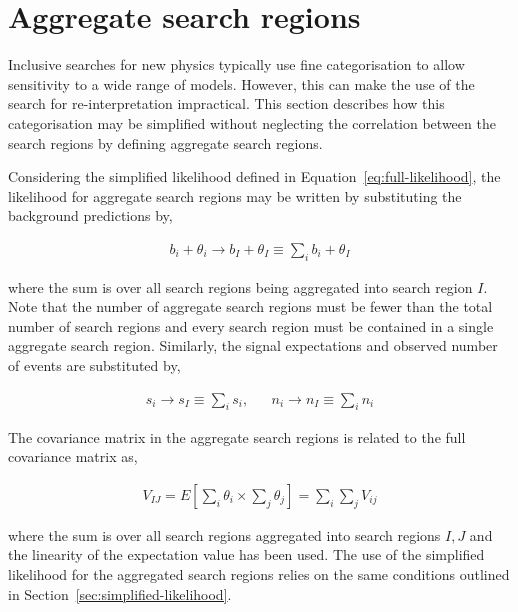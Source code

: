 \section{Aggregate search regions}
\label{sec:aggregate-signal-regions}

Inclusive searches for new physics typically use fine categorisation to allow
sensitivity to a wide range of models. However, this can make the use
of the search for re-interpretation impractical. 
This section describes how this categorisation may be simplified without neglecting the correlation 
between the search regions by defining aggregate search regions.

Considering the simplified likelihood defined in Equation~\ref{eq:full-likelihood},
the likelihood for aggregate search regions may be written by substituting the 
background predictions by,

\begin{align}
b_{i} + \theta_i \rightarrow b_I + \theta_I \equiv \sum_{i}b_{i} + \theta_I
\label{eq:b-agg}
\end{align}

where the sum is over all search regions being aggregated into search region $I$.
Note that the number of aggregate search regions must be fewer than the total number of search regions and 
every search region must be contained in a single aggregate search region. 
Similarly, the signal expectations and observed number of events are substituted by, 

\begin{align}
 s_{i}  \rightarrow s_{I} \equiv \sum_{i}s_{i},  &&  n_{i}  \rightarrow n_{I} \equiv \sum_{i}n_{i} 
\label{eq:b-agg}
\end{align}


The covariance matrix in the aggregate search regions is related to the full covariance matrix as, 

\begin{align}
V_{IJ}=E[\sum_{i}\theta_{i}\times\sum_{j}\theta_{j}] = \sum_{i}\sum_{j}V_{ij}
\label{eq:agg-cov}
\end{align}

where the sum is over all search regions aggregated into search regions $I,J$ and the linearity of the expectation
value has been used.  The use of the simplified likelihood for the aggregated search regions 
relies on the same conditions outlined in Section~\ref{sec:simplified-likelihood}. 

